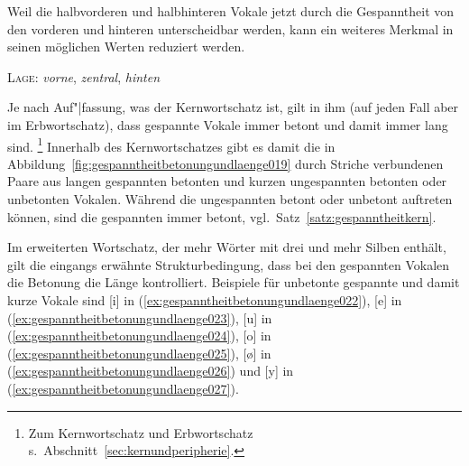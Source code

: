 Weil die halbvorderen und halbhinteren Vokale jetzt durch die Gespanntheit von den vorderen und hinteren unterscheidbar werden, kann ein weiteres Merkmal in seinen möglichen Werten reduziert werden.

\Stretch[0.5]

\begin{exe}
  \ex \textsc{Lage}: \textit{vorne}, \textit{zentral}, \textit{hinten}
\end{exe}

\Stretch[0.5]
\Enl[-1]

Je nach Auf"|fassung, was der Kernwortschatz ist, gilt in ihm (auf jeden Fall aber im Erbwortschatz), dass gespannte Vokale immer betont und damit immer lang sind.%
\footnote{Zum Kernwortschatz und Erbwortschatz s.\ Abschnitt~\ref{sec:kernundperipherie}.}
Innerhalb des Kernwortschatzes gibt es damit die in Abbildung~\ref{fig:gespanntheitbetonungundlaenge019} durch Striche verbundenen Paare aus langen gespannten betonten und kurzen ungespannten betonten oder unbetonten Vokalen.
Während die ungespannten betont oder unbetont auftreten können, sind die gespannten immer betont, vgl.\ Satz~\ref{satz:gespanntheitkern}.

\Stretch


Im erweiterten Wortschatz, der mehr Wörter mit drei und mehr Silben enthält, gilt die eingangs erwähnte Strukturbedingung, dass bei den gespannten Vokalen die Betonung die Länge kontrolliert.
Beispiele für unbetonte gespannte und damit kurze Vokale sind [i] in (\ref{ex:gespanntheitbetonungundlaenge022}), [e] in (\ref{ex:gespanntheitbetonungundlaenge023}), [u] in (\ref{ex:gespanntheitbetonungundlaenge024}), [o] in (\ref{ex:gespanntheitbetonungundlaenge025}), [ø] in (\ref{ex:gespanntheitbetonungundlaenge026}) und [y] in (\ref{ex:gespanntheitbetonungundlaenge027}).

\Stretch[0.5]

